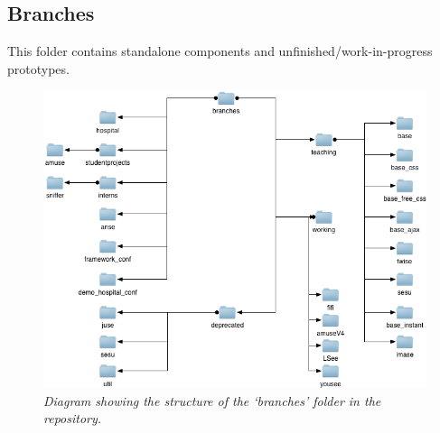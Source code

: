 \documentclass[letterpaper,10pt,english]{sphinxmanual}
\begin{document}
\subsection{Branches}
\label{repo:branches}
This folder contains standalone components and unfinished/work-in-progress prototypes.
\begin{figure}[htbp]
\centering
\capstart

\includegraphics{branches.png}
\caption{\emph{Diagram showing the structure of the `branches' folder in the repository.}}\end{figure}
\end{document}
